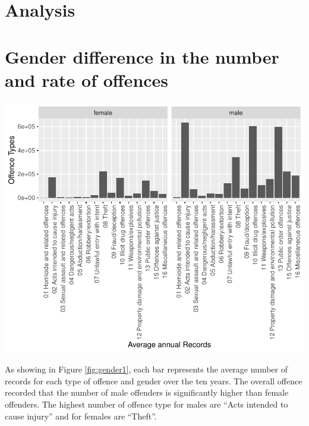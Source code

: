 \documentclass[11pt,a4paper,]{article}
\let\origfigure\figure
\let\endorigfigure\endfigure
\renewenvironment{figure}[1][2] {
\expandafter\origfigure\expandafter[H]
} {
\endorigfigure
}
\begin{document}
\hypertarget{analysis}{%
\section{Analysis}\label{analysis}}

\section*{Gender difference in the number and rate of offences}

\begin{figure}
\centering
\includegraphics{ETC5513-Assignment4_files/figure-latex/gender1-1.pdf}
\caption{\label{fig:gender1}Yearly average offence records of different offence type}
\end{figure}

As showing in Figure \ref{fig:gender1}, each bar represents the average number of records for each type of offence and gender over the ten years. The overall offence recorded that the number of male offenders is significantly higher than female offenders. The highest number of offence type for males are ``Acts intended to cause injury'' and for females are ``Theft''.
\end{document}
